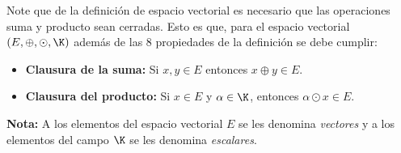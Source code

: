 \documentclass[compacto,10pt]{pubciencias-notas}
\begin{document}
\begin{advertencia}
    Note que de la definición de espacio vectorial es necesario que las operaciones suma y producto sean cerradas. Esto es que, para el espacio vectorial $(E,\oplus,\odot,\K)$ además de las 8 propiedades de la definición se debe cumplir:

    \begin{itemize}[leftmargin=*]
        \item[] \textbf{Clausura de la suma:} Si $x,y\in E$ entonces $x\oplus y\in E$. 
        \item[] \textbf{Clausura del producto:} Si $x\in E$ y $\alpha\in\K$, entonces $\alpha\odot x\in E$.
    \end{itemize}
\end{advertencia}

\textbf{Nota:}
A los elementos del espacio vectorial $E$ se les denomina \emph{vectores} y a los elementos del campo $\K$ se les denomina \emph{escalares}.
\end{document}
